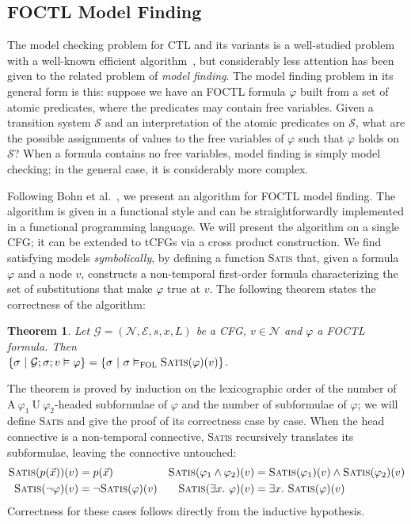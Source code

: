 \documentclass{eptcs}
\newtheorem{theorem}{Theorem}
\newcommand{\AU}[2]{\textrm{A}\ #1\ \textrm{U}\ #2}
\newcommand{\foctlmod}[4]{#1;#2;#3\vDash #4}
\newcommand{\smtmod}[2]{#1\vDash_{\textsc{FOL}}#2}
\newcommand{\satis}[1]{\textsc{Satis}(#1)}
\begin{document}
\subsection{FOCTL Model Finding}
\label{foctl}
The model checking problem for \ac{CTL} and its variants is a well-studied problem with a
well-known efficient algorithm~\cite{clarkemc}, but considerably less
attention has been given to the related problem of \emph{model finding}. The model
finding problem in its general form is this: suppose we have an \ac{FOCTL} formula $\varphi$ built from a set
of atomic predicates, where the predicates may contain free variables. Given a transition
system $\mathcal{S}$ and an interpretation of the atomic predicates on $\mathcal{S}$, what
are the possible assignments of values to the free variables of $\varphi$ such
that $\varphi$ holds on $\mathcal{S}$? When a formula contains no free variables, model
finding is simply model checking; in the general case, it is considerably more complex. 

Following Bohn et al.~\cite{foctl}, we present an algorithm for \ac{FOCTL} model finding. The algorithm is given in a functional style and can be straightforwardly implemented in a functional programming language. 
We will present the algorithm on a single CFG; it can be extended to \acp{tCFG} via a cross
product construction. We find satisfying models \emph{symbolically}, by defining a function \textsc{Satis} that, given a formula $\varphi$ and a node $v$, constructs a non-temporal first-order 
formula characterizing the set of substitutions that make $\varphi$ true at $v$.
The following theorem states the correctness of the algorithm:

\begin{theorem}\label{mfcorrect}
Let $\mathcal{G} = (\mathcal{N},\mathcal{E},s,x,L)$ be a CFG, $v\in \mathcal{N}$ and $\varphi$ a \ac{FOCTL} formula. Then
\\$\{\sigma\ |\ \foctlmod{\mathcal{G}}{\sigma}{v}{\varphi}\}
=\{\sigma\ |\ \smtmod{\sigma}{\satis{\varphi}(v)}\}$.
\end{theorem}

The theorem is proved by induction on the lexicographic order of the number of
$\AU{\varphi_1}{\varphi_2}$-headed subformulae of $\varphi$ and the number of subformulae of
$\varphi$; we will define \textsc{Satis} and give the proof of its correctness case by case.
When the head connective is a non-temporal connective, 
\textsc{Satis} recursively translates its subformulae, leaving the connective untouched:
\begin{align*}
\satis{p(\vec{x})}(v)&=p(\vec{x})&
\satis{\varphi_1\land\varphi_2}(v)&=\satis{\varphi_1}(v)\land\satis{\varphi_2}(v)\\
\satis{\neg\varphi}(v)&=\neg\satis{\varphi}(v)&
\satis{\exists x.\ \varphi}(v)&=\exists x.\ \satis{\varphi}(v)
\end{align*}
Correctness for these cases follows directly from the inductive hypothesis.
\end{document}
